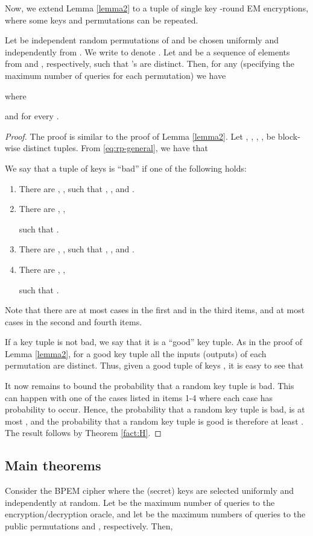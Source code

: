 \documentclass{llncs}
\begin{document}
Now, we extend Lemma \ref{lemma2} to a tuple  of single key -round EM encryptions, where some keys and permutations can be repeated.
\begin{lemma}\label{lemma3}
Let  be independent random permutations of  and  be chosen uniformly and independently from . We write  to denote . Let  and   be a sequence of elements from  and , respectively, such that 's are distinct. Then, for any  (specifying the maximum number of queries for each permutation) we have

where

and  for every .
\end{lemma}
\begin{proof}
The proof is similar to the proof of Lemma \ref{lemma2}. Let , , , , be block-wise distinct tuples. From \eqref{eq:rp-general}, we have that

We say that a tuple of keys  is ``bad'' if one of the following holds:
\begin{enumerate}
 \item
There are , ,
 such that
,
, and
.
 \item
There are , ,

such that
.
 \item
There are , ,
 such that
, , and
.
 \item
There are , ,

such that
.
\end{enumerate}
Note that there are at most 
cases in the first and in the third items, and at most
 cases in the second and fourth items.

If a key tuple is not bad, we say that it is a ``good'' key tuple.
As in the proof of Lemma \ref{lemma2},
for a good key tuple all the inputs (outputs) of each permutation are distinct.
Thus, given a good tuple of keys , it is easy to see that

It now remains to bound the probability that a random key tuple is bad. This can happen with one of the cases listed in items 1-4 where each case has probability  to occur. Hence, the probability that a random key tuple is bad, is at most
, and the probability that a random key tuple is good is therefore at least . The result follows by Theorem \ref{fact:H}.
\end{proof}

\subsection{Main theorems}
\begin{theorem}\label{thm:indistinguish}
Consider the BPEM cipher  where the (secret) keys
 are selected uniformly and independently at random.
Let  be the maximum number of queries to the encryption/decryption oracle, and let  be the maximum numbers of queries to the public permutations  and , respectively. Then,

\end{theorem}
\end{document}
